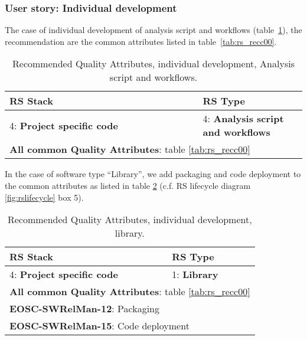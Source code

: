\subsubsection{User story: Individual development}

The case of individual development of analysis script and workflows (table~\ref{tab:rs_recc01}), the recommendation are the common attributes listed in table~\ref{tab:rs_recc00}.

\begin{center}
\begin{table}
  \label{tab:rs_recc01}
  \small
  \begin{tabular}{|p{0.65\linewidth}|p{0.35\linewidth}|} \hline

    \textbf{RS Stack} & \textbf{RS Type} \\ \hline \hline
    4: \textbf{Project specific code} &
    4: \textbf{Analysis script and workflows} \\ \hline \hline
    \multicolumn{2}{|l|}{\textbf{All common Quality Attributes}: table \ref{tab:rs_recc00}} \\ \hline

  \end{tabular}
  \caption{Recommended Quality Attributes, individual development, Analysis script and workflows.}
\end{table}
\end{center}

In the case of software type ``Library'', we add packaging and code deployment to the common attributes as listed in table \ref{tab:rs_recc02} (c.f. RS lifecycle diagram \ref{fig:rslifecycle} box 5).

\begin{center}
\begin{table}
  \label{tab:rs_recc02}
  \small
  \begin{tabular}{|p{0.65\linewidth}|p{0.35\linewidth}|} \hline

    \textbf{RS Stack} & \textbf{RS Type} \\ \hline \hline
    4: \textbf{Project specific code} &
    1: \textbf{Library} \\ \hline \hline
    \multicolumn{2}{|l|}{\textbf{All common Quality Attributes}: table \ref{tab:rs_recc00}} \\ \hline
    \multicolumn{2}{|l|}{\textbf{EOSC-SWRelMan-12}: Packaging} \\ \hline
    \multicolumn{2}{|l|}{\textbf{EOSC-SWRelMan-15}: Code deployment} \\ \hline

  \end{tabular}
  \caption{Recommended Quality Attributes, individual development, library.}
\end{table}
\end{center}

